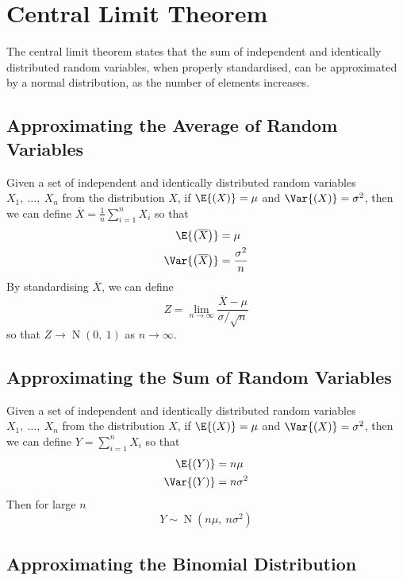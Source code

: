 \documentclass{article}
\begin{document}
\section{Central Limit Theorem}
The central limit theorem states that the sum of independent and identically distributed random variables, when properly standardised,
can be approximated by a normal distribution, as the number of elements increases.
\subsection{Approximating the Average of Random Variables}
Given a set of independent and identically distributed random variables \(X_1,\: \ldots,\: X_n\) from the distribution \(X\),
if \(\E{\left( X \right)} = \mu\) and \(\Var{\left( X \right)} = \sigma^2\), then we can define \(\overline{X} = \frac{1}{n} \sum_{i = 1}^n X_i\)
so that
\begin{align*}
    \E{\left( \overline{X} \right)}   & = \mu                \\
    \Var{\left( \overline{X} \right)} & = \frac{\sigma^2}{n}
\end{align*}
By standardising \(\overline{X}\), we can define
\begin{equation*}
    Z = \lim_{n \to \infty} \frac{\overline{X} - \mu}{\sigma / \sqrt{n}}
\end{equation*}
so that \(Z \to \operatorname{N}{\left( 0,\: 1 \right)}\) as \(n \to \infty\).
\subsection{Approximating the Sum of Random Variables}
Given a set of independent and identically distributed random variables \(X_1,\: \ldots,\: X_n\) from the distribution \(X\),
if \(\E{\left( X \right)} = \mu\) and \(\Var{\left( X \right)} = \sigma^2\), then we can define \(Y = \sum_{i = 1}^n X_i\)
so that
\begin{align*}
    \E{\left( Y \right)}   & = n \mu      \\
    \Var{\left( Y \right)} & = n \sigma^2
\end{align*}
Then for large \(n\)
\begin{equation*}
    Y \sim \operatorname{N}{\left( n \mu,\: n \sigma^2 \right)}
\end{equation*}
\subsection{Approximating the Binomial Distribution}
\end{document}
